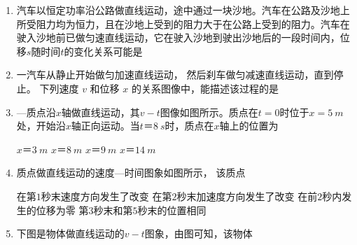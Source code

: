 \begin{enumerate}[leftmargin=0em]
{}



\item 
{}
汽车以恒定功率沿公路做直线运动，途中通过一块沙地。汽车在公路及沙地上所受阻力均为恒力，且在沙地上受到的阻力大于在公路上受到的阻力。汽车在驶入沙地前已做匀速直线运动，它在驶入沙地到驶出沙地后的一段时间内，位移$ s $随时间$ t $的变化关系可能是  
\begin{figure}[h!]
\centering

\end{figure}




\newpage	
\item
{}
一汽车从静止开始做匀加速直线运动， 然后刹车做匀减速直线运动，直到停止。 下列速度 $ v $ 和位移 $ x $ 的关系图像中，能描述该过程的是  
\begin{figure}[h!]
\centering

\end{figure}

\item 
{}
—质点沿$ x $轴做直线运动，其$ v-t $图像如图所示。质点在$ t = 0 $时位于$ x= 5 \ m $处，开始沿$ x $轴正向运动。当$ t $＝$ 8 \ s $时，质点在$ x $轴上的位置为  
\begin{figure}[h!]
\centering

\end{figure}

\fourchoices
{$ x $＝$ 3 \ m $ }
{$ x $＝$ 8 \ m $}
{$ x $＝$ 9 \ m $ }
{$ x $＝$ 14 \ m $}


\item 
{}
质点做直线运动的速度—时间图象如图所示，
该质点  
\begin{figure}[h!]
\centering

\end{figure}


\fourchoices
{在第$ 1 $秒末速度方向发生了改变}
{在第$ 2 $秒末加速度方向发生了改变}
{在前$ 2 $秒内发生的位移为零}
{第$ 3 $秒末和第$ 5 $秒末的位置相同}


\item 
{}
下图是物体做直线运动的$ v-t $图象，由图可知，该物体  
\begin{figure}[h!]
\centering

\end{figure}



\end{enumerate}
